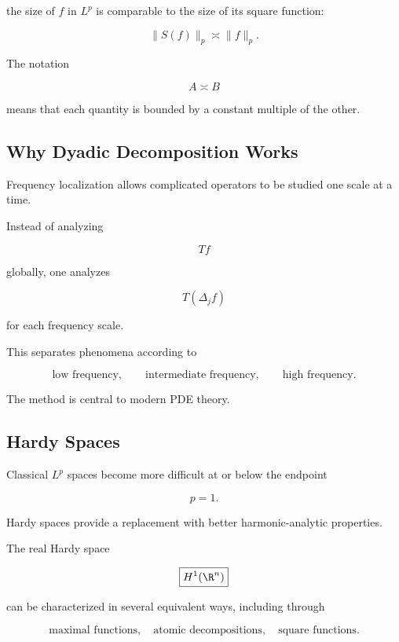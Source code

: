 the size of \(f\) in \(L^p\) is comparable to the size of its square
function:

\[
\boxed{
\|S(f)\|_p
\asymp
\|f\|_p.
}
\]

The notation

\[
A\asymp B
\]

means that each quantity is bounded by a constant multiple of the other.

\subsection{Why Dyadic Decomposition Works}
\label{subsec:why-dyadic}

Frequency localization allows complicated operators to be studied one
scale at a time.

Instead of analyzing

\[
Tf
\]

globally, one analyzes

\[
T(\Delta_jf)
\]

for each frequency scale.

This separates phenomena according to

\[
\boxed{
\text{low frequency},
\qquad
\text{intermediate frequency},
\qquad
\text{high frequency}.
}
\]

The method is central to modern PDE theory.

\subsection{Hardy Spaces}
\label{subsec:hardy-spaces}

Classical \(L^p\) spaces become more difficult at or below the endpoint

\[
p=1.
\]

Hardy spaces provide a replacement with better harmonic-analytic
properties.

The real Hardy space

\[
\boxed{
H^1(\R^n)
}
\]

can be characterized in several equivalent ways, including through

\[
\boxed{
\text{maximal functions},
\quad
\text{atomic decompositions},
\quad
\text{square functions}.
}
\]

